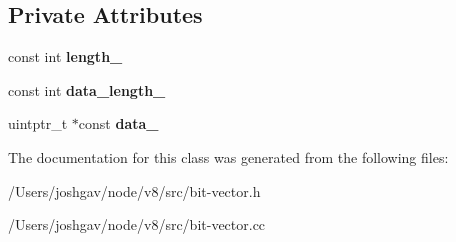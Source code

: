 \subsection*{Private Attributes}
\begin{DoxyCompactItemize}
\item 
const int {\bfseries length\+\_\+}\hypertarget{classv8_1_1internal_1_1_bit_vector_ad538da978a8345ed703ea29e05d72fdc}{}\label{classv8_1_1internal_1_1_bit_vector_ad538da978a8345ed703ea29e05d72fdc}

\item 
const int {\bfseries data\+\_\+length\+\_\+}\hypertarget{classv8_1_1internal_1_1_bit_vector_ae5f2cb67208b8e94b6cfdba5f149a3ea}{}\label{classv8_1_1internal_1_1_bit_vector_ae5f2cb67208b8e94b6cfdba5f149a3ea}

\item 
uintptr\+\_\+t $\ast$const {\bfseries data\+\_\+}\hypertarget{classv8_1_1internal_1_1_bit_vector_afb767a1caf8523509c3c522db5d46f1b}{}\label{classv8_1_1internal_1_1_bit_vector_afb767a1caf8523509c3c522db5d46f1b}

\end{DoxyCompactItemize}


The documentation for this class was generated from the following files\+:\begin{DoxyCompactItemize}
\item 
/\+Users/joshgav/node/v8/src/bit-\/vector.\+h\item 
/\+Users/joshgav/node/v8/src/bit-\/vector.\+cc\end{DoxyCompactItemize}
